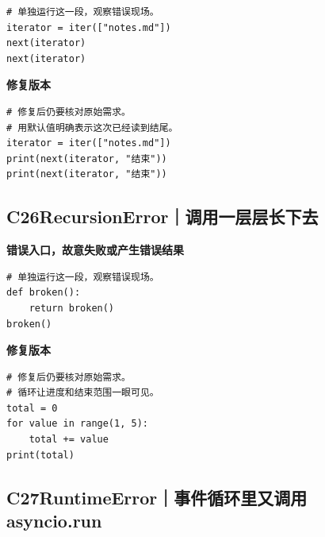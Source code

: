 \begin{lstlisting}[style=errorcode,title={错误复现（故意失败或错误结果）：\code{case_25_bad.py.txt}}]
# 单独运行这一段，观察错误现场。
iterator = iter(["notes.md"])
next(iterator)
next(iterator)
\end{lstlisting}

\textbf{修复版本}

\begin{lstlisting}[title={\code{case_25.py}}]
# 修复后仍要核对原始需求。
# 用默认值明确表示这次已经读到结尾。
iterator = iter(["notes.md"])
print(next(iterator, "结束"))
print(next(iterator, "结束"))
\end{lstlisting}


\subsection*{C26\enspace RecursionError｜调用一层层长下去}





\textbf{错误入口，故意失败或产生错误结果}

\begin{lstlisting}[style=errorcode,title={错误复现（故意失败或错误结果）：\code{case_26_bad.py.txt}}]
# 单独运行这一段，观察错误现场。
def broken():
    return broken()
broken()
\end{lstlisting}

\textbf{修复版本}

\begin{lstlisting}[title={\code{case_26.py}}]
# 修复后仍要核对原始需求。
# 循环让进度和结束范围一眼可见。
total = 0
for value in range(1, 5):
    total += value
print(total)
\end{lstlisting}


\subsection*{C27\enspace RuntimeError｜事件循环里又调用 asyncio.run}

